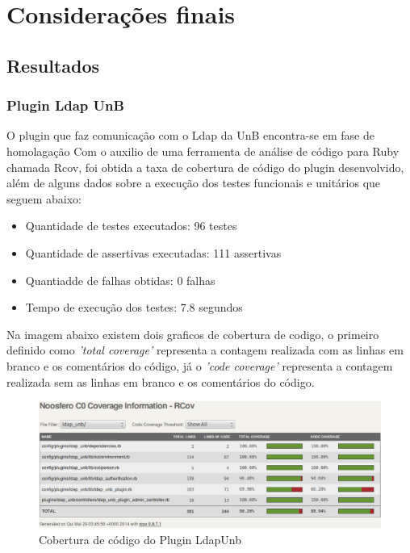 \chapter{Considerações finais}
\label{consideracoes-finais}


\section{Resultados}
\label{results}

\subsection{Plugin Ldap UnB}

O plugin que faz comunicação com o Ldap da UnB encontra-se em fase de homolagação
Com o auxilio de uma ferramenta de análise de código para Ruby chamada Rcov, foi obtida a taxa de cobertura de código do plugin desenvolvido, além de alguns dados sobre a execução dos testes funcionais e unitários que seguem abaixo:

\begin{itemize}
\item Quantidade de testes executados: 96 testes
\item Quantidade de assertivas executadas: 111 assertivas
\item Quantiadde de falhas obtidas: 0 falhas
\item Tempo de execução dos testes: 7.8 segundos
\end{itemize}
%
Na imagem abaixo existem dois graficos de cobertura de codigo, o primeiro definido como \textit{'total coverage'} representa a contagem realizada com as linhas em branco e os comentários do código, já o \textit{'code coverage'} representa a contagem realizada sem as linhas em branco e os comentários do código.
%
\begin{figure}[!h]
    \centering
    \includegraphics[keepaspectratio=false,scale=0.45]
      {figuras/cobertura_teste.eps}
    \caption{Cobertura de código do Plugin LdapUnb}
    \label{noosfero_bug}
\end{figure}
%

